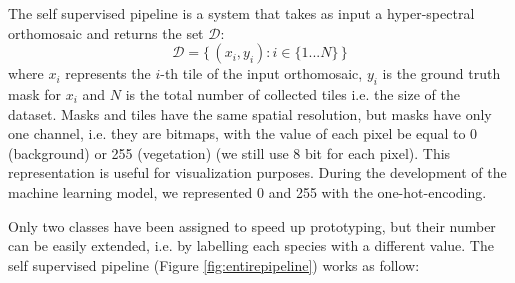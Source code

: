 \documentclass[comsoc,final]{IEEEtran}
\newcommand{\todo}[1]{\textcolor{red}{#1}}
\begin{document}
The self supervised pipeline is a system that takes as input a hyper-spectral orthomosaic and returns the set $\mathcal{D}$: \[
\mathcal{D} = \{\, (x_i,y_i):i \in \{1...N\}\,\}
\] where $x_i$ represents the $i$-th tile of the input orthomosaic, $y_i$ is the ground truth mask for $x_i$ and $N$ is the total number of collected tiles i.e. the size of the dataset.
Masks and tiles have the same spatial resolution, but masks have only one channel, i.e. they are bitmaps, with the value of each pixel be equal to 0 (background) or 255 (vegetation) (we still use 8 bit for each pixel). This representation is useful for visualization purposes. During the development of the machine learning model, we represented 0 and 255 with the one-hot-encoding.

Only two classes have been assigned to speed up prototyping, but their number can be easily extended, i.e. by labelling each species with a different value. The self supervised pipeline (Figure \ref{fig:entirepipeline}) works as follow:
\end{document}
